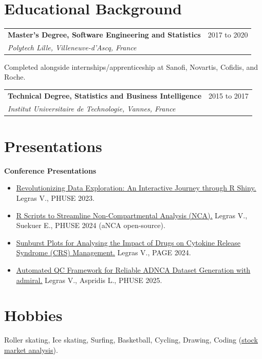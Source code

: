 \documentclass[10pt,a4paper]{article}
\makeatletter
\newcommand{\link}[2]{\href{#1}{\textcolor{linkblue}{\uline{#2}}}}
\newcommand{\role}[3]{%
  \vspace{7pt}
  \noindent\begin{tabularx}{\linewidth}{@{}Xr@{}}
    \textbf{#1} & \textcolor{muted}{#3} \\
    \textit{#2} & \\
  \end{tabularx}%
}
\newcommand{\skillhead}[1]{\vspace{3pt}\noindent\textbf{\color{accent}#1}\par\vspace{1pt}}
\makeatother
\begin{document}
\section{Educational Background}

\role{Master's Degree, Software Engineering and Statistics}{Polytech Lille, Villeneuve-d'Ascq, France}{2017 to 2020}
\vspace{1pt}
\noindent\textcolor{muted}{\small Completed alongside internships/apprenticeship at Sanofi, Novartis, Cofidis, and Roche.}
\vspace{3pt}

\role{Technical Degree, Statistics and Business Intelligence}{Institut Universitaire de Technologie, Vannes, France}{2015 to 2017}

\section{Presentations}
{\sloppy
\skillhead{Conference Presentations}
\begin{itemize}
  \item \link{https://phuse.s3.eu-central-1.amazonaws.com/Archive/2023/Connect/EU/Birmingham/PRE_DV02.pdf}{Revolutionizing
        Data Exploration: An Interactive Journey through R Shiny.} Legras V.,
        PHUSE 2023.
  \item \link{https://phuse.s3.eu-central-1.amazonaws.com/Archive/2024/Connect/EU/Strasbourg/PRE_SM06.pdf}{R
        Scripts to Streamline Non-Compartmental Analysis (NCA).} Legras V.,
        Suekuer E., PHUSE 2024 (aNCA open-source).
  \item \link{https://www.page-meeting.org/wp-content/uploads/pdf_assets/11030-abstract.pdf}{Sunburst
        Plots for Analysing the Impact of Drugs on Cytokine Release Syndrome
        (CRS) Management.} Legras V., PAGE 2024.
  \item \link{https://phuse.s3.eu-central-1.amazonaws.com/Archive/2025/Connect/EU/Hamburg/PRE_SM05.pdf}{Automated
        QC Framework for Reliable ADNCA Dataset Generation with admiral.}
        Legras V., Aspridis L., PHUSE 2025.
\end{itemize}
\par}%

\section{Hobbies}
Roller skating, Ice skating, Surfing, Basketball, Cycling, Drawing,
Coding (\link{https://shaakon35.github.io/Stock_portfolio/}{stock market analysis}).
\end{document}
